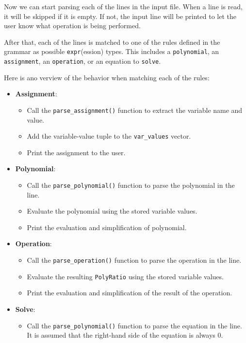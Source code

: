 Now we can start parsing each of the lines in the input file. When a line is read, it will be skipped if it is empty. If not, the input line will be printed to let the user know what operation is being performed.

After that, each of the lines is matched to one of the rules defined in the grammar as possible \verb|expr|(ession) types. This includes a \verb|polynomial|, an \verb|assignment|, an \verb|operation|, or an equation to \verb|solve|.

Here is ano verview of the behavior when matching each of the rules:
\begin{itemize}
    \item \textbf{Assignment}:
    \begin{itemize}
        \item Call the \verb|parse_assignment()| function to extract the variable name and value.
        \item Add the variable-value tuple to the \verb|var_values| vector.
        \item Print the assignment to the user.
    \end{itemize}
    \item \textbf{Polynomial}:
    \begin{itemize}
        \item Call the \verb|parse_polynomial()| function to parse the polynomial in the line.
        \item Evaluate the polynomial using the stored variable values.
        \item Print the evaluation and simplification of polynomial.
    \end{itemize}
    \item \textbf{Operation}:
    \begin{itemize}
        \item Call the \verb|parse_operation()| function to parse the operation in the line.
        \item Evaluate the resulting \verb|PolyRatio| using the stored variable values.
        \item Print the evaluation and simplification of the result of the operation.
    \end{itemize}
    \item \textbf{Solve}:
    \begin{itemize}
        \item Call the \verb|parse_polynomial()| function to parse the equation in the line. It is assumed that the right-hand side of the equation is always $0$.

\end{itemize}
\end{itemize}
